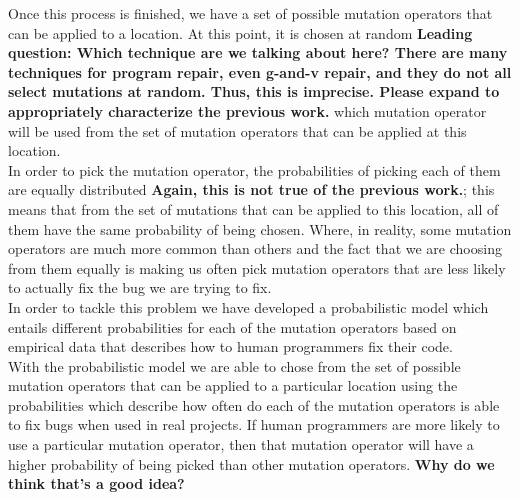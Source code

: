 \documentclass[conference]{IEEEtran}
\newcommand{\todo}[1]
  {{\scriptsize \textbf{\color{red} {#1}}}}
\begin{document}
Once this process is finished, we have a set of possible mutation operators that
can be applied to a location. At this point, it is chosen at random\todo{Leading
  question: Which technique are we talking about here?  There are many
  techniques for program repair, even g-and-v repair, and they do not all select
  mutations at random.  Thus, this is imprecise.  Please expand to appropriately
  characterize the previous work.}  which mutation operator will be used from the set of mutation operators that can be applied at this location. \\
In order to pick the mutation operator, the probabilities of picking each of
them are equally distributed\todo{Again, this is not true of the previous work.}; this means that from the set of mutations that can be applied to this location, all of them have the same probability of being chosen. Where, in reality, some mutation operators are much more common than others and the fact that we are choosing from them equally is making us often pick mutation operators that are less likely to actually fix the bug we are trying to fix.\\
In order to tackle this problem we have developed a probabilistic model which entails different probabilities for each of the mutation operators based on empirical data that describes how to human programmers fix their code.\\
With the probabilistic model we are able to chose from the set of possible
mutation operators that can be applied to a particular location using the
probabilities which describe how often do each of the mutation operators is able
to fix bugs when used in real projects. If human programmers are more likely to
use a particular mutation operator, then that mutation operator will have a
higher probability of being picked than other mutation operators.\todo{Why do we
  think that's a good idea?}\\


%
%
\end{document}
